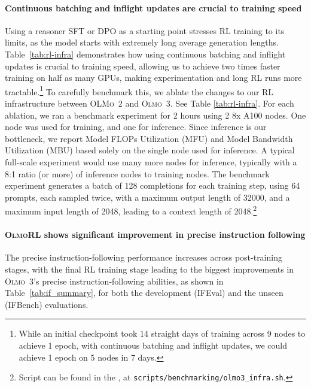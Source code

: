 \documentclass[table]{ai2style/ai2}
\newcommand{\oldOlmo}{OLMo\xspace}
\newcommand{\newOlmo}{Olmo\xspace}
\newcommand{\olmotoo}{\textsc{\oldOlmo~2}\xspace}
\newcommand{\olmothree}{\textsc{\newOlmo~3}\xspace}
\newcommand{\olmothreerl}{\textsc{\newOlmo{}RL}\xspace}
\begin{document}
{{\paragraph{Continuous batching and inflight updates are crucial to training speed} Using a reasoner SFT or DPO as a starting point stresses RL training to its limits, as the model starts with extremely long average generation lengths. Table~\ref{tab:rl-infra} demonstrates how using continuous batching and inflight updates is crucial to training speed, allowing us to achieve two times faster training on half as many GPUs, making experimentation and long RL runs more tractable.\footnote{While an initial checkpoint took 14 straight days of training across 9 nodes to achieve 1 epoch, with continuous batching and inflight updates, we could achieve 1 epoch on 5 nodes in 7 days.}
To carefully benchmark this, we ablate the changes to our RL infrastructure between \olmotoo and \olmothree. See Table \ref{tab:rl-infra}. 
For each ablation, we ran a benchmark experiment for 2 hours using 2 8x A100 nodes. One node was used for training, and one for inference. Since inference is our bottleneck, we report Model FLOPs Utilization (MFU) and Model Bandwidth Utilization (MBU)  based solely on the single node used for inference. A typical full-scale experiment would use many more nodes for inference, typically with a 8:1 ratio (or more) of inference nodes to training nodes. The benchmark experiment generates a batch of 128 completions for each training step, using 64 prompts, each sampled twice, with a maximum output length of 32000, and a maximum input length of 2048, leading to a context length of 2048.\footnote{Script can be found in the \href{https://github.com/allenai/open-instruct}{}, at \texttt{scripts/benchmarking/olmo3\_infra.sh}.} 

\paragraph{\olmothreerl shows significant improvement in precise instruction following} The precise instruction-following performance increases across post-training stages, with the final RL training stage leading to the biggest improvements in \olmothree's precise instruction-following abilities, as shown in Table~\ref{tab:if_summary}, for both the development (IFEval) and the unseen (IFBench) evaluations.

}}
\end{document}
